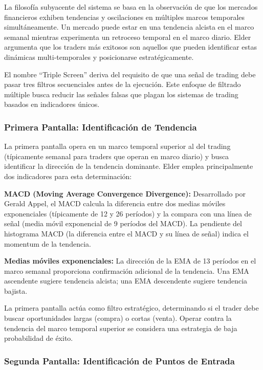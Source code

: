\documentclass[11pt,a4paper]{article}
\begin{document}
La filosofía subyacente del sistema se basa en la observación de que los mercados financieros exhiben tendencias y oscilaciones en múltiples marcos temporales simultáneamente. Un mercado puede estar en una tendencia alcista en el marco semanal mientras experimenta un retroceso temporal en el marco diario. Elder argumenta que los traders más exitosos son aquellos que pueden identificar estas dinámicas multi-temporales y posicionarse estratégicamente.

El nombre ``Triple Screen'' deriva del requisito de que una señal de trading debe pasar tres filtros secuenciales antes de la ejecución. Este enfoque de filtrado múltiple busca reducir las señales falsas que plagan los sistemas de trading basados en indicadores únicos.

\subsubsection{Primera Pantalla: Identificación de Tendencia}

La primera pantalla opera en un marco temporal superior al del trading (típicamente semanal para traders que operan en marco diario) y busca identificar la dirección de la tendencia dominante. Elder emplea principalmente dos indicadores para esta determinación:

\textbf{MACD (Moving Average Convergence Divergence):} Desarrollado por Gerald Appel, el MACD calcula la diferencia entre dos medias móviles exponenciales (típicamente de 12 y 26 períodos) y la compara con una línea de señal (media móvil exponencial de 9 períodos del MACD). La pendiente del histograma MACD (la diferencia entre el MACD y su línea de señal) indica el momentum de la tendencia.

\textbf{Medias móviles exponenciales:} La dirección de la EMA de 13 períodos en el marco semanal proporciona confirmación adicional de la tendencia. Una EMA ascendente sugiere tendencia alcista; una EMA descendente sugiere tendencia bajista.

La primera pantalla actúa como filtro estratégico, determinando si el trader debe buscar oportunidades largas (compra) o cortas (venta). Operar contra la tendencia del marco temporal superior se considera una estrategia de baja probabilidad de éxito.

\subsubsection{Segunda Pantalla: Identificación de Puntos de Entrada}
\end{document}
